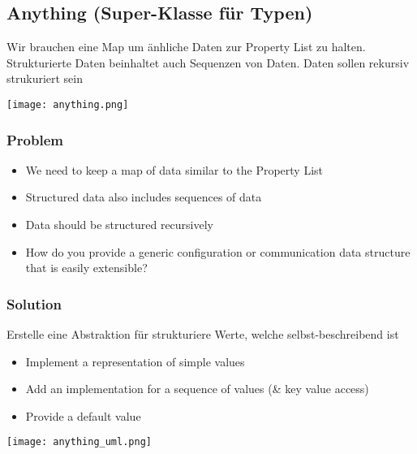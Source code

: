 \vfill\null
\columnbreak

\subsection{Anything (Super-Klasse für Typen)}

Wir brauchen eine Map um änhliche Daten zur Property List zu halten. Strukturierte Daten beinhaltet auch Sequenzen von Daten. Daten sollen rekursiv strukuriert sein

\texttt{[image: anything.png]}

\subsubsection{Problem}
\begin{itemize}
    \item We need to keep a map of data similar to the Property List
    \item Structured data also includes sequences of data
    \item Data should be structured recursively
    \item How do you provide a generic configuration or communication data structure that is easily extensible?
\end{itemize}

\subsubsection{Solution}
Erstelle eine Abstraktion für strukturiere Werte, welche selbst-beschreibend ist

\begin{itemize}
    \item Implement a representation of simple values
    \item Add an implementation for a sequence of values (\& key value access)
    \item Provide a default value
\end{itemize}
\texttt{[image: anything\_uml.png]}
